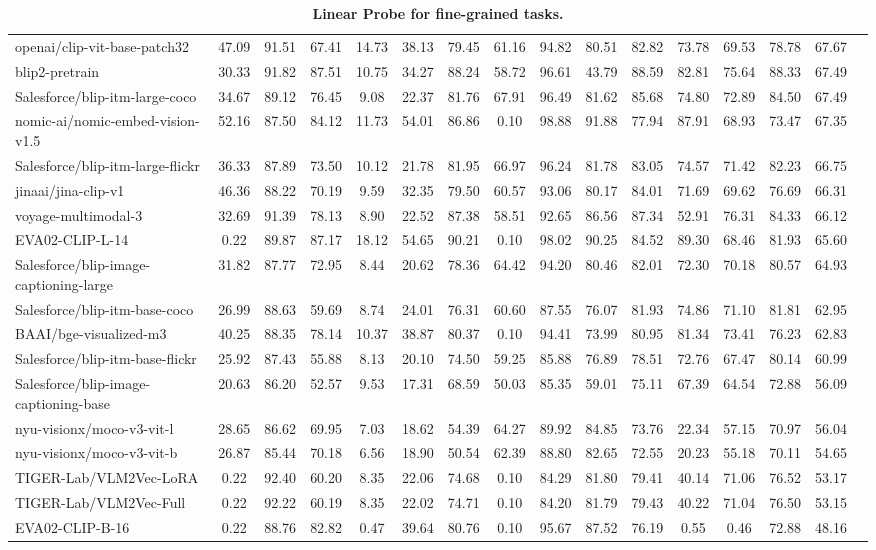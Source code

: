 \begin{table*}
{\begin{tabular}{lccccccccccccccc}
openai/clip-vit-base-patch32 &47.09 &91.51 &67.41 &14.73 &38.13 &79.45 &61.16 &94.82 &80.51 &82.82 &73.78 &69.53 &78.78 &67.67 \\
blip2-pretrain &30.33 &91.82 &87.51 &10.75 &34.27 &88.24 &58.72 &96.61 &43.79 &88.59 &82.81 &75.64 &88.33 &67.49 \\
Salesforce/blip-itm-large-coco &34.67 &89.12 &76.45 &9.08 &22.37 &81.76 &67.91 &96.49 &81.62 &85.68 &74.80 &72.89 &84.50 &67.49 \\
nomic-ai/nomic-embed-vision-v1.5 &52.16 &87.50 &84.12 &11.73 &54.01 &86.86 &0.10 &98.88 &91.88 &77.94 &87.91 &68.93 &73.47 &67.35 \\
Salesforce/blip-itm-large-flickr &36.33 &87.89 &73.50 &10.12 &21.78 &81.95 &66.97 &96.24 &81.78 &83.05 &74.57 &71.42 &82.23 &66.75 \\
jinaai/jina-clip-v1 &46.36 &88.22 &70.19 &9.59 &32.35 &79.50 &60.57 &93.06 &80.17 &84.01 &71.69 &69.62 &76.69 &66.31 \\
voyage-multimodal-3 &32.69 &91.39 &78.13 &8.90 &22.52 &87.38 &58.51 &92.65 &86.56 &87.34 &52.91 &76.31 &84.33 &66.12 \\
EVA02-CLIP-L-14 &0.22 &89.87 &87.17 &18.12 &54.65 &90.21 &0.10 &98.02 &90.25 &84.52 &89.30 &68.46 &81.93 &65.60 \\
Salesforce/blip-image-captioning-large &31.82 &87.77 &72.95 &8.44 &20.62 &78.36 &64.42 &94.20 &80.46 &82.01 &72.30 &70.18 &80.57 &64.93 \\
Salesforce/blip-itm-base-coco &26.99 &88.63 &59.69 &8.74 &24.01 &76.31 &60.60 &87.55 &76.07 &81.93 &74.86 &71.10 &81.81 &62.95 \\
BAAI/bge-visualized-m3 &40.25 &88.35 &78.14 &10.37 &38.87 &80.37 &0.10 &94.41 &73.99 &80.95 &81.34 &73.41 &76.23 &62.83 \\
Salesforce/blip-itm-base-flickr &25.92 &87.43 &55.88 &8.13 &20.10 &74.50 &59.25 &85.88 &76.89 &78.51 &72.76 &67.47 &80.14 &60.99 \\
Salesforce/blip-image-captioning-base &20.63 &86.20 &52.57 &9.53 &17.31 &68.59 &50.03 &85.35 &59.01 &75.11 &67.39 &64.54 &72.88 &56.09 \\
nyu-visionx/moco-v3-vit-l &28.65 &86.62 &69.95 &7.03 &18.62 &54.39 &64.27 &89.92 &84.85 &73.76 &22.34 &57.15 &70.97 &56.04 \\
nyu-visionx/moco-v3-vit-b &26.87 &85.44 &70.18 &6.56 &18.90 &50.54 &62.39 &88.80 &82.65 &72.55 &20.23 &55.18 &70.11 &54.65 \\
TIGER-Lab/VLM2Vec-LoRA &0.22 &92.40 &60.20 &8.35 &22.06 &74.68 &0.10 &84.29 &81.80 &79.41 &40.14 &71.06 &76.52 &53.17 \\
TIGER-Lab/VLM2Vec-Full &0.22 &92.22 &60.19 &8.35 &22.02 &74.71 &0.10 &84.20 &81.79 &79.43 &40.22 &71.04 &76.50 &53.15 \\
EVA02-CLIP-B-16 &0.22 &88.76 &82.82 &0.47 &39.64 &80.76 &0.10 &95.67 &87.52 &76.19 &0.55 &0.46 &72.88 &48.16 \\
\bottomrule
\end{tabular}}
\caption{\textbf{Linear Probe for fine-grained tasks.}}\label{tab: linear probe fine}
\end{table*}

\newpage